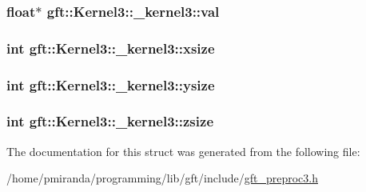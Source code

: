 \subsubsection[{\texorpdfstring{val}{val}}]{\setlength{\rightskip}{0pt plus 5cm}float$\ast$ gft\+::\+Kernel3\+::\+\_\+kernel3\+::val}\hypertarget{structgft_1_1Kernel3_1_1__kernel3_a2cf5ef95427f4d81f2634a065f69c0af}{}\label{structgft_1_1Kernel3_1_1__kernel3_a2cf5ef95427f4d81f2634a065f69c0af}
\subsubsection[{\texorpdfstring{xsize}{xsize}}]{\setlength{\rightskip}{0pt plus 5cm}int gft\+::\+Kernel3\+::\+\_\+kernel3\+::xsize}\hypertarget{structgft_1_1Kernel3_1_1__kernel3_af168a4a8ef87b8044048f61b7eda1ea6}{}\label{structgft_1_1Kernel3_1_1__kernel3_af168a4a8ef87b8044048f61b7eda1ea6}
\subsubsection[{\texorpdfstring{ysize}{ysize}}]{\setlength{\rightskip}{0pt plus 5cm}int gft\+::\+Kernel3\+::\+\_\+kernel3\+::ysize}\hypertarget{structgft_1_1Kernel3_1_1__kernel3_a7969c6204643647713a7f57b65a9840d}{}\label{structgft_1_1Kernel3_1_1__kernel3_a7969c6204643647713a7f57b65a9840d}
\subsubsection[{\texorpdfstring{zsize}{zsize}}]{\setlength{\rightskip}{0pt plus 5cm}int gft\+::\+Kernel3\+::\+\_\+kernel3\+::zsize}\hypertarget{structgft_1_1Kernel3_1_1__kernel3_a4571d07a33802441efb94822dea3d665}{}\label{structgft_1_1Kernel3_1_1__kernel3_a4571d07a33802441efb94822dea3d665}


The documentation for this struct was generated from the following file\+:\begin{DoxyCompactItemize}
\item 
/home/pmiranda/programming/lib/gft/include/\hyperlink{gft__preproc3_8h}{gft\+\_\+preproc3.\+h}\end{DoxyCompactItemize}
